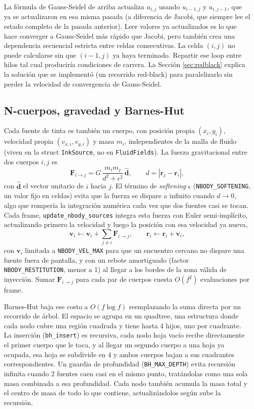 \documentclass[11pt]{article}
\begin{document}
La fórmula de Gauss-Seidel de arriba actualiza $u_{i,j}$ usando
$u_{i-1,j}$ y $u_{i,j-1}$, que ya se actualizaron en esa misma pasada
(a diferencia de Jacobi, que siempre lee el estado completo de la pasada
anterior). Leer valores ya actualizados es lo que hace converger a
Gauss-Seidel más rápido que Jacobi, pero también crea una dependencia
secuencial estricta entre celdas consecutivas. La celda $(i,j)$ no puede
calcularse sin que $(i-1,j)$ ya haya terminado. Repartir ese loop entre
hilos tal cual produciría condiciones de carrera. La Sección
\ref{sec:redblack} explica la solución que se implementó (un recorrido
red-black) para paralelizarlo sin perder la velocidad de convergencia de
Gauss-Seidel.

\subsection{N-cuerpos, gravedad y Barnes-Hut}

Cada fuente de tinta es también un cuerpo, con posición propia
$(x_i, y_i)$, velocidad propia $(v_{x,i}, v_{y,i})$ y masa $m_i$,
independientes de la malla de fluido (viven en la struct
\texttt{InkSource}, no en \texttt{FluidFields}). La fuerza gravitacional
entre dos cuerpos $i, j$ es
\[
\mathbf{F}_{i \to j} = G \, \frac{m_i m_j}{d^2 + \epsilon^2} \, \hat{\mathbf{d}}, \qquad d = |\mathbf{r}_j - \mathbf{r}_i|,
\]
con $\hat{\mathbf{d}}$ el vector unitario de $i$ hacia $j$. El término de
\emph{softening} $\epsilon$ (\texttt{NBODY\_SOFTENING}, un valor fijo en
celdas) evita que la fuerza se dispare a infinito cuando $d \to 0$, algo
que rompería la integración numérica cada vez que dos fuentes casi se
tocan. Cada frame, \texttt{update\_nbody\_sources} integra esta fuerza
con Euler semi-implícito, actualizando primero la velocidad y luego la
posición con esa velocidad ya nueva,
\[
\mathbf{v}_i \leftarrow \mathbf{v}_i + \sum_{j \neq i} \mathbf{F}_{i \to j}, \qquad \mathbf{r}_i \leftarrow \mathbf{r}_i + \mathbf{v}_i,
\]
con $\mathbf{v}_i$ limitada a \texttt{NBODY\_VEL\_MAX} para que un
encuentro cercano no dispare una fuente fuera de pantalla, y con un
rebote amortiguado (factor \texttt{NBODY\_RESTITUTION}, menor a 1) al
llegar a los bordes de la zona válida de inyección. Sumar
$\mathbf{F}_{i \to j}$ para cada par de cuerpos cuesta $O(f^2)$
evaluaciones por frame.

Barnes-Hut \cite{barneshut1986} baja ese costo a $O(f \log f)$
reemplazando la suma directa por un recorrido de árbol. El espacio se
agrupa en un quadtree, una estructura donde cada nodo cubre una región
cuadrada y tiene hasta 4 hijos, uno por cuadrante. La inserción
(\texttt{bh\_insert}) es recursiva, cada nodo hoja vacío recibe
directamente el primer cuerpo que le toca, y al llegar un segundo cuerpo
a una hoja ya ocupada, esa hoja se subdivide en 4 y ambos cuerpos bajan a
sus cuadrantes correspondientes. Un guardia de profundidad
(\texttt{BH\_MAX\_DEPTH}) evita recursión infinita cuando 2 fuentes caen
casi en el mismo punto, tratándolas como una sola masa combinada a esa
profundidad. Cada nodo también acumula la masa total y el centro de masa
de todo lo que contiene, actualizándolos según sube la recursión.
\end{document}
